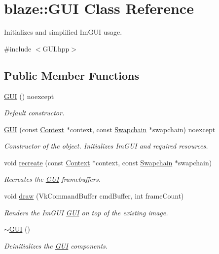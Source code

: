 \hypertarget{classblaze_1_1GUI}{}\section{blaze\+:\+:G\+UI Class Reference}
\label{classblaze_1_1GUI}


Initializes and simplified Im\+G\+UI usage.  




{\ttfamily \#include $<$G\+U\+I.\+hpp$>$}

\subsection*{Public Member Functions}
\begin{DoxyCompactItemize}
\item 
\mbox{\label{classblaze_1_1GUI_a8c105baf7ed38911094c496346128a54}} 
\hyperlink{classblaze_1_1GUI_a8c105baf7ed38911094c496346128a54}{G\+UI} () noexcept
\begin{DoxyCompactList}\small\item\em Default constructor. \end{DoxyCompactList}\item 
\hyperlink{classblaze_1_1GUI_aa23a611841b303e39ff7eddd5295dc52}{G\+UI} (const \hyperlink{classblaze_1_1Context}{Context} $\ast$context, const \hyperlink{classblaze_1_1Swapchain}{Swapchain} $\ast$swapchain) noexcept
\begin{DoxyCompactList}\small\item\em Constructor of the object. Initializes Im\+G\+UI and required resources. \end{DoxyCompactList}\item 
void \hyperlink{classblaze_1_1GUI_a510ebaca6e980af7e3355ae3365d7c68}{recreate} (const \hyperlink{classblaze_1_1Context}{Context} $\ast$context, const \hyperlink{classblaze_1_1Swapchain}{Swapchain} $\ast$swapchain)
\begin{DoxyCompactList}\small\item\em Recreates the \hyperlink{classblaze_1_1GUI}{G\+UI} framebuffers. \end{DoxyCompactList}\item 
void \hyperlink{classblaze_1_1GUI_aa73bd1251e8c44e3bc98fe1f4f8b25a5}{draw} (Vk\+Command\+Buffer cmd\+Buffer, int frame\+Count)
\begin{DoxyCompactList}\small\item\em Renders the Im\+G\+UI \hyperlink{classblaze_1_1GUI}{G\+UI} on top of the existing image. \end{DoxyCompactList}\item 
\mbox{\label{classblaze_1_1GUI_adc54ba170be92e95bd884fb6202937f7}} 
\hyperlink{classblaze_1_1GUI_adc54ba170be92e95bd884fb6202937f7}{$\sim$\+G\+UI} ()
\begin{DoxyCompactList}\small\item\em Deinitializes the \hyperlink{classblaze_1_1GUI}{G\+UI} components. \end{DoxyCompactList}\end{DoxyCompactItemize}
